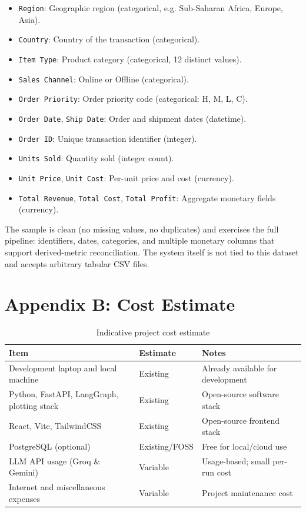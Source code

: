 \documentclass[12pt,a4paper,openany]{report}
\begin{document}
\begin{itemize}
	\item \texttt{Region}: Geographic region (categorical, e.g. Sub-Saharan Africa, Europe, Asia).
	\item \texttt{Country}: Country of the transaction (categorical).
	\item \texttt{Item Type}: Product category (categorical, 12 distinct values).
	\item \texttt{Sales Channel}: Online or Offline (categorical).
	\item \texttt{Order Priority}: Order priority code (categorical: H, M, L, C).
	\item \texttt{Order Date}, \texttt{Ship Date}: Order and shipment dates (datetime).
	\item \texttt{Order ID}: Unique transaction identifier (integer).
	\item \texttt{Units Sold}: Quantity sold (integer count).
	\item \texttt{Unit Price}, \texttt{Unit Cost}: Per-unit price and cost (currency).
	\item \texttt{Total Revenue}, \texttt{Total Cost}, \texttt{Total Profit}: Aggregate monetary fields (currency).
\end{itemize}

The sample is clean (no missing values, no duplicates) and exercises the full pipeline: identifiers, dates, categories, and multiple monetary columns that support derived-metric reconciliation. The system itself is not tied to this dataset and accepts arbitrary tabular CSV files.

\section*{Appendix B: Cost Estimate}

\begin{table}[H]
\centering
\caption{Indicative project cost estimate}
\label{tab:cost-estimate-app}
\begin{tabular}{p{6cm} p{3cm} p{3cm}}
\hline
Item & Estimate & Notes \\
\hline
Development laptop and local machine & Existing & Already available for development \\
Python, FastAPI, LangGraph, plotting stack & Existing & Open-source software stack \\
React, Vite, TailwindCSS & Existing & Open-source frontend stack \\
PostgreSQL (optional) & Existing/FOSS & Free for local/cloud use \\
LLM API usage (Groq \& Gemini) & Variable & Usage-based; small per-run cost \\
Internet and miscellaneous expenses & Variable & Project maintenance cost \\
\hline
\end{tabular}
\end{table}
\end{document}
